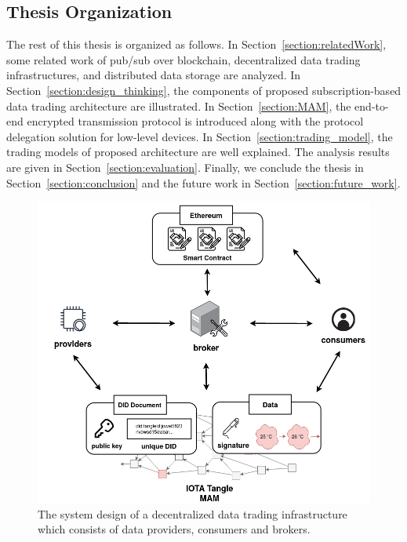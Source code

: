 \begin{spacing}{2.0}
\section{Thesis Organization}
The rest of this thesis is organized as follows. In Section~\ref{section:relatedWork}, some related work of pub/sub over blockchain, decentralized data trading infrastructures, and distributed data storage are analyzed. In Section~\ref{section:design_thinking}, the components of proposed subscription-based data trading architecture are illustrated. In Section~\ref{section:MAM}, the end-to-end encrypted transmission protocol is introduced along with the protocol delegation solution for low-level devices. In Section~\ref{section:trading_model}, the trading models of proposed architecture are well explained. The analysis results are given in Section~\ref{section:evaluation}. Finally, we conclude the thesis in Section~\ref{section:conclusion} and the future work in Section~\ref{section:future_work}.

\begin{figure}[!t]
    \centering
    \includegraphics[width=5.in]{img/system_design}
    \caption{The system design of a decentralized data trading infrastructure which consists of data providers, consumers and brokers.}
    \label{fig:system_design}
\end{figure}

\end{spacing}

\clearpage
{}

